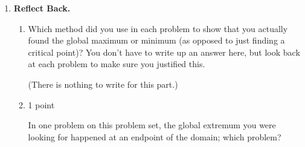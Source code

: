 \documentclass{article}
\newcommand{\highlight}[1]{\boldmath\hl{\textbf{#1}}\unboldmath}
\begin{document}
\begin{enumerate}
\begin{solution}
    \highlight{Critical points:} Now we need to find the critical points
    on the domain. $C'(r) = 24P(2r -\frac{16}{r^2})$, so
    \begin{align*}
      24P\left(2r - \frac{16}{r^2}\right) &= 0 \\
      2r - \frac{16}{r^2} &= 0 \\
      \frac{2r^3 - 16}{r^2} &= 0 \\
      2r^3 - 16 &= 0 \\
      r^3 &= 8 \\
      r &= 2
    \end{align*}
    $C'(r)$ is undefined when $r=0$, but $r=0$ isn't in the domain, so the
    only critical point is $r=2$. 

    \highlight{Global minimum:} Since this is the only critical point on the domain,
    if we can show that it is a local minimum, then it must be the global minimum. We'll
    use the Second Derivative Test. $C''(r) = 24P(2+\frac{32}{r^3})$, so $C''(2)$ is positive,
    and therefore $C(r)$ achieves its global minimum at $r=10$.

    \highlight{Answer the question:} The corresponding value of $h$ to $r=10$
    is $h=\frac{192}{\pi(10)^2}=\frac{48}{25\pi}$. To minimize cost, the company should
    design the can to have a  and a .
  \end{solution}

\item \textbf{Reflect Back.}

  \begin{enumerate}
  \item
    \begin{problem}
      Which method did you use in each problem to show that you actually found the global maximum or minimum (as opposed to just finding a critical point)? You don't have to write up an answer here, but look back at each problem to make sure you justified this.

      (There is nothing to write for this part.) 
    \end{problem}

  \item \label{optimization-reflect-back}

    \begin{grading}
      1 point
    \end{grading}

    \begin{problem}[0.75in]
      In one problem on this problem set, the global extremum you were looking for happened at an endpoint of the domain; which problem?
    \end{problem}


\end{enumerate}
\end{enumerate}
\end{document}
